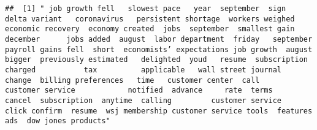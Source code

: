 \documentclass[
]{article}
\begin{document}
\begin{verbatim}
##  [1] " job growth fell   slowest pace   year  september  sign  delta variant   coronavirus   persistent shortage  workers weighed   economic recovery  economy created  jobs  september  smallest gain  december      jobs added  august  labor department  friday   september payroll gains fell  short  economists’ expectations job growth  august  bigger  previously estimated   delighted  youd   resume  subscription    charged           tax          applicable   wall street journal           change  billing preferences   time   customer center  call         customer service            notified  advance     rate  terms           cancel  subscription  anytime  calling         customer service         click confirm  resume  wsj membership customer service tools  features ads  dow jones products"                                                                                                                                                                                                                                                                                                                                                                                                                                                                                                                                                                                                                                                                                                                                                                                                                                                                                                                                                                                                                                                                                                                                                                                                                                                                                                                                                                                                                                                                                                                                                                                                                                                                                                                                                                                                                                                                                                                                                                                                                                                                                                                                                                                                                                                                                                                                                                                                                                                                                                                                                        
\end{verbatim}
\end{document}
